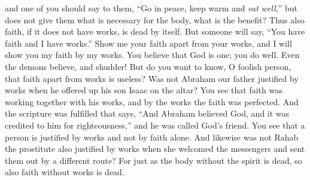 \begin{biblechapter}
\verse and one of you should say to them, “Go in peace, keep warm and \textit{eat well},” but does not give them what is necessary for the body, what is the benefit?
\verse Thus also faith, if it does not have works, is dead by itself.
\verse But someone will say, “You have faith and I have works.” Show me your faith apart from your works, and I will show you my faith by my works.
\verse You believe that God is one; you do well. Even the demons believe, and shudder!
\verse But do you want to know, O foolish person, that faith apart from works is useless?
\verse Was not Abraham our father justified by works when he offered up his son Isaac on the altar?
\verse You see that faith was working together with his works, and by the works the faith was perfected.
\verse And the scripture was fulfilled that says, “And Abraham believed God, and it was credited to him for righteousness,” and he was called God’s friend.
\verse You see that a person is justified by works and not by faith alone.
\verse And likewise was not Rahab the prostitute also justified by works when she welcomed the messengers and sent them out by a different route?
\verse For just as the body without the spirit is dead, so also faith without works is dead.
\end{biblechapter}

